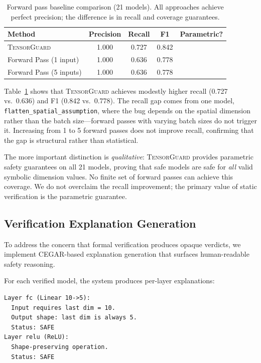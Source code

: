\documentclass[11pt]{article}
\newcommand{\cmark}{\ding{51}}
\newcommand{\xmark}{\ding{55}}
\begin{document}
\begin{table}[t]
\centering
\caption{Forward pass baseline comparison (21 models).  All approaches
  achieve perfect precision; the difference is in recall and coverage
  guarantees.}
\label{tab:forward-pass}
\small
\begin{tabular}{@{}lcccc@{}}
\toprule
\textbf{Method} & \textbf{Precision} & \textbf{Recall} & \textbf{F1} &
  \textbf{Parametric?} \\
\midrule
\textsc{TensorGuard}       & 1.000 & 0.727 & 0.842 & \cmark \\
Forward Pass (1 input)     & 1.000 & 0.636 & 0.778 & \xmark \\
Forward Pass (5 inputs)    & 1.000 & 0.636 & 0.778 & \xmark \\
\bottomrule
\end{tabular}
\end{table}

Table~\ref{tab:forward-pass} shows that \textsc{TensorGuard} achieves
modestly higher recall (0.727 vs.\ 0.636) and F1 (0.842 vs.\ 0.778).
The recall gap comes from one model, \texttt{flatten\_spatial\_assumption},
where the bug depends on the spatial dimension rather than the batch
size---forward passes with varying batch sizes do not trigger it.
Increasing from 1 to 5 forward passes does not improve recall,
confirming that the gap is structural rather than statistical.

The more important distinction is \emph{qualitative}: \textsc{TensorGuard}
provides parametric safety guarantees on all 21 models, proving
that safe models are safe for \emph{all} valid symbolic dimension
values.  No finite set of forward passes can achieve this coverage.
We do not overclaim the recall improvement; the primary value of
static verification is the parametric guarantee.

\subsection{Verification Explanation Generation}\label{sec:explanations}

To address the concern that formal verification produces opaque
verdicts, we implement CEGAR-based explanation generation that
surfaces human-readable safety reasoning.

For each verified model, the system produces per-layer explanations:
\begin{lstlisting}[style=noline,language={},basicstyle=\ttfamily\footnotesize,caption={Example explanation for a safe model.},label={lst:explain}]
Layer fc (Linear 10->5):
  Input requires last dim = 10.
  Output shape: last dim is always 5.
  Status: SAFE
Layer relu (ReLU):
  Shape-preserving operation.
  Status: SAFE
\end{lstlisting}
\end{document}
